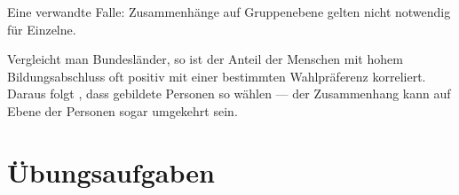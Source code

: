 \begin{warnung}
Eine verwandte Falle: Zusammenhänge auf Gruppenebene gelten nicht notwendig für Einzelne.

Vergleicht man Bundesländer, so ist der Anteil der Menschen mit hohem Bildungsabschluss oft positiv mit einer bestimmten Wahlpräferenz korreliert. Daraus folgt , dass gebildete Personen so wählen --- der Zusammenhang kann auf Ebene der Personen sogar umgekehrt sein.

\begin{center}
\begin{minipage}{0.88\textwidth}
\end{minipage}
\end{center}
\end{warnung}

\section{Übungsaufgaben}

